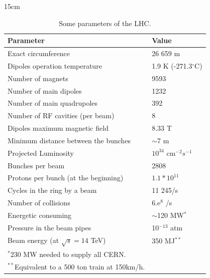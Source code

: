 \begin{table}[htbp]{15cm}
\caption{Some parameters of the LHC.}
\begin{tabular}{p{10cm}p{4cm}}
\hline \hline
Parameter									&	Value					    \\
\hline
Exact circumference						    &	26 659 m					\\
Dipoles operation temperature 			    &	1.9 K (-271.3$^{\circ}$C)	\\
Number of magnets                           &	9593						\\
Number of main dipoles          			&	1232						\\
Number of main quadrupoles                  &	392							\\
Number of RF cavities (per beam)			&	8        					\\
Dipoles maximum magnetic field  			&	8.33 T						\\
Minimum distance between the bunches 		&	$\sim$7 m					\\
Projected Luminosity 						&	$10^{34}$ cm$^{-2}s^{-1}$	\\
Bunches per beam 					        &	2808						\\
Protons per bunch (at the beginning)        &	$1.1*10^{11}$				\\
Cycles in the ring by a beam    			&	11 245/s					\\
Number of collisions						&	6.e$^{8}$ /s		        \\
Energetic consuming						    &	$\sim$120 MW$^{*}$			\\
Pressure in the beam pipes          		&	10$^{-13}$ atm				\\
Beam energy        (at $\sqrt{s} = 14$ TeV)	&	350 MJ$^{**}$				\\
\hline
$^{*}$230 MW needed to supply all CERN.		&								\\
$^{**}$Equivalent to a 500 ton train at 150km/h. &					\\
\hline
\end{tabular}
\label{tab:lhc_parameters}
\end{table}

